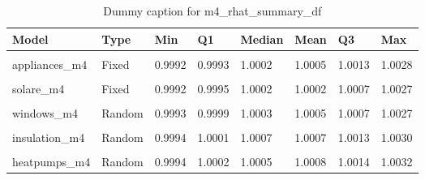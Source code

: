 \begin{table}
\centering
\caption{Dummy caption for m4_rhat_summary_df}
\centering
\fontsize{10}{12}\selectfont
\begin{tabular}[t]{llllllll}
\toprule
Model & Type & Min & Q1 & Median & Mean & Q3 & Max\\
\midrule
\cellcolor{gray!10}{windows\_m4} & \cellcolor{gray!10}{Fixed} & \cellcolor{gray!10}{0.9992} & \cellcolor{gray!10}{0.9995} & \cellcolor{gray!10}{1.0001} & \cellcolor{gray!10}{1.0005} & \cellcolor{gray!10}{1.0013} & \cellcolor{gray!10}{1.0031}\\
appliances\_m4 & Fixed & 0.9992 & 0.9993 & 1.0002 & 1.0005 & 1.0013 & 1.0028\\
\cellcolor{gray!10}{insulation\_m4} & \cellcolor{gray!10}{Fixed} & \cellcolor{gray!10}{0.9992} & \cellcolor{gray!10}{0.9995} & \cellcolor{gray!10}{1.0003} & \cellcolor{gray!10}{1.0004} & \cellcolor{gray!10}{1.0011} & \cellcolor{gray!10}{1.0025}\\
solare\_m4 & Fixed & 0.9992 & 0.9995 & 1.0002 & 1.0002 & 1.0007 & 1.0027\\
\cellcolor{gray!10}{heatpumps\_m4} & \cellcolor{gray!10}{Fixed} & \cellcolor{gray!10}{0.9994} & \cellcolor{gray!10}{0.9997} & \cellcolor{gray!10}{1.0008} & \cellcolor{gray!10}{1.0010} & \cellcolor{gray!10}{1.0020} & \cellcolor{gray!10}{1.0047}\\
windows\_m4 & Random & 0.9993 & 0.9999 & 1.0003 & 1.0005 & 1.0007 & 1.0027\\
\cellcolor{gray!10}{appliances\_m4} & \cellcolor{gray!10}{Random} & \cellcolor{gray!10}{0.9993} & \cellcolor{gray!10}{0.9997} & \cellcolor{gray!10}{1.0001} & \cellcolor{gray!10}{1.0003} & \cellcolor{gray!10}{1.0007} & \cellcolor{gray!10}{1.0018}\\
insulation\_m4 & Random & 0.9994 & 1.0001 & 1.0007 & 1.0007 & 1.0013 & 1.0030\\
\cellcolor{gray!10}{solare\_m4} & \cellcolor{gray!10}{Random} & \cellcolor{gray!10}{0.9994} & \cellcolor{gray!10}{0.9997} & \cellcolor{gray!10}{1.0002} & \cellcolor{gray!10}{1.0004} & \cellcolor{gray!10}{1.0010} & \cellcolor{gray!10}{1.0022}\\
heatpumps\_m4 & Random & 0.9994 & 1.0002 & 1.0005 & 1.0008 & 1.0014 & 1.0032\\
\bottomrule
\end{tabular}
\end{table}
